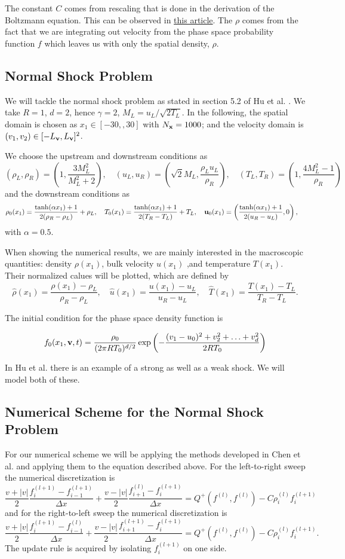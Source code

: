 \documentclass{article}
\def\b{\textbf}
\def\l{\left}
\def\r{\right}
\begin{document}
The constant $C$ comes from rescaling that is done in the derivation of the Boltzmann equation. This can be observed in \href{https://gyu-eun-lee.github.io/academic/gso_boltzmann.pdf}{this article}. The $\rho$ comes from the fact that we are integrating out velocity from the phase space probability function $f$ which leaves us with only the spatial density, $\rho$.
\subsection{Normal Shock Problem}
We will tackle the normal shock problem as stated in section 5.2 of Hu et al. \cite{hu2021adaptive}. We take $R=1$, $d=2$, hence $\gamma=2$, $M_L=u_L / \sqrt{2T_L}$. In the following, the spatial domain is chosen as $x_1 \in [-30,,30]$ with $N_{\b x} = 1000$; and the velocity domain is $(v_1,v_2) \in [-L_{\b v},L_{\b v}]^2$.

We choose the upstream and downstream conditions as
\[
    (\rho_L,\rho_R) = \left( 1, \frac{3M_L^2}{M_L^2 + 2}\right), \quad
    (u_L, u_R) = \left(\sqrt{2} M_L, \frac{\rho_L u_L}{\rho_R}\right), \quad
    (T_L, T_R) = \left(1, \frac{4M_L^2 - 1}{\rho_R} \right)
\]
and the downstream conditions as
\[
    \rho_0(x_1) = \frac{\tanh(\alpha x_1) + 1}{2(\rho_R - \rho_L)} + \rho_L, \quad
    T_0(x_1) = \frac{\tanh(\alpha x_1) + 1}{2(T_R - T_L)} + T_L, \quad
    \b u_0(x_1) = \left(\frac{\tanh(\alpha x_1) + 1}{2(u_R - u_L)}, 0 \right), \quad
\]
with $\alpha = 0.5$.

When showing the numerical results, we are mainly interested in the macroscopic quantities: density $\rho(x_1)$, bulk  velocity $u(x_1)$ ,and temperature $T(x_1)$. Their normalized calues will be plotted, which are defined by
\[
    \hat \rho(x_1) = \frac{\rho(x_1) - \rho_L}{\rho_R - \rho_L}, \quad
    \hat u(x_1) = \frac{u(x_1) - u_L}{u_R - u_L}, \quad
    \hat T(x_1) = \frac{T(x_1) - T_L}{T_R - T_L}.
\]

The initial condition for the phase space density function is

\[
    f_0(x_1, \b v, t) = \frac{\rho_0}{(2 \pi R T_0)^{d/2}} \exp \l(- \frac{(v_1 - u_0)^2 + v_2^2 + \hdots + v_d^2}{2 R T_0}\r)
\]

In Hu et al. \cite{hu2021adaptive} there is an example of a strong as well as a weak shock. We will model both of these.
\subsection{Numerical Scheme for the Normal Shock Problem}
For our numerical scheme we will be applying the methods developed in Chen et al. \cite{CHEN2013452} and applying them to the equation described above. For the left-to-right sweep the numerical discretization is 
\[
    \frac{v + |v|}{2} \frac{f_i^{(l+1)} - f_{i-1}^{(l+1)}}{\Delta x} + \frac{v - |v|}{2} \frac{f_{i+1}^{(l)} - f_i^{(l+1)}}{\Delta x} = Q^+(f^{(l)}, f^{(l)}) - C \rho_i^{(l)} f_i^{(l+1)}
\]
and for the right-to-left sweep the numerical discretization is
\[
    \frac{v + |v|}{2} \frac{f_i^{(l+1)} - f_{i-1}^{(l)}}{\Delta x} + \frac{v - |v|}{2} \frac{f_{i+1}^{(l+1)} - f_i^{(l+1)}}{\Delta x} = Q^+(f^{(l)}, f^{(l)}) - C \rho_i^{(l)} f_i^{(l+1)}.
\]
The update rule is acquired by isolating $f_i^{(l+1)}$ on one side.
\end{document}
